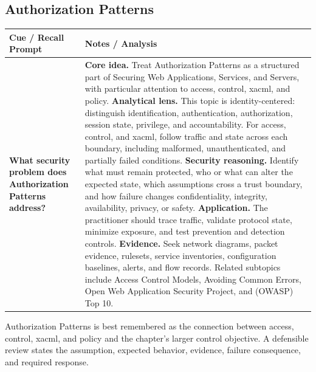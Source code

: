\documentclass[11pt]{article}
\newcommand{\CornellHeader}{%
\rowcolor{Navy}\color{white}\bfseries Cue / Recall Prompt & \color{white}\bfseries Notes / Analysis\\\hline}
\newcommand{\CornellRow}[2]{%
\cellcolor{CueGray}\RaggedRight\textbf{#1} & \RaggedRight #2\\\hline}
\begin{document}
\subsection*{Authorization Patterns}
\begin{longtable}{>{\RaggedRight\arraybackslash}p{}|>{\RaggedRight\arraybackslash}p{}}
\CornellHeader
\CornellRow{What security problem does Authorization Patterns address?}{\textbf{Core idea.} Treat Authorization Patterns as a structured part of Securing Web Applications, Services, and Servers, with particular attention to access, control, xacml, and policy. \textbf{Analytical lens.} This topic is identity-centered: distinguish identification, authentication, authorization, session state, privilege, and accountability. For access, control, and xacml, follow traffic and state across each boundary, including malformed, unauthenticated, and partially failed conditions. \textbf{Security reasoning.} Identify what must remain protected, who or what can alter the expected state, which assumptions cross a trust boundary, and how failure changes confidentiality, integrity, availability, privacy, or safety. \textbf{Application.} The practitioner should trace traffic, validate protocol state, minimize exposure, and test prevention and detection controls. \textbf{Evidence.} Seek network diagrams, packet evidence, rulesets, service inventories, configuration baselines, alerts, and flow records. Related subtopics include Access Control Models, Avoiding Common Errors, Open Web Application Security Project, and (OWASP) Top 10.}
\end{longtable}
\begin{topicsummary}
Authorization Patterns is best remembered as the connection between access, control, xacml, and policy and the chapter's larger control objective. A defensible review states the assumption, expected behavior, evidence, failure consequence, and required response.
\end{topicsummary}
\end{document}
